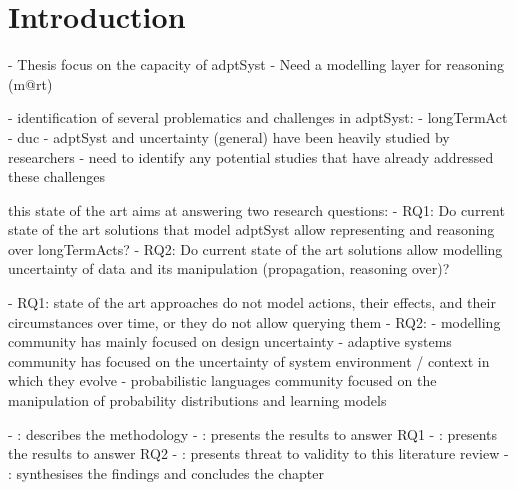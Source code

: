 \section{Introduction}

- Thesis focus on the capacity of \gls{adptSyst}
- Need a modelling layer for reasoning (\gls{m@rt})

- identification of several problematics and challenges in \gls{adptSyst}:
	- \gls{longTermAct}
	- \gls{duc}
- \gls{adptSyst} and uncertainty (general) have been heavily studied by researchers
- need to identify any potential studies that have already addressed these challenges

this state of the art aims at answering two research questions:
- RQ1: Do current state of the art solutions that model \gls{adptSyst} allow representing and reasoning over \glspl{longTermAct}? 
- RQ2: Do current state of the art solutions allow modelling uncertainty of data and its manipulation (propagation, reasoning over)? 


- RQ1: state of the art approaches do not model actions, their effects, and their circumstances over time, or they do not allow querying them
- RQ2:
	- modelling community has mainly focused on design uncertainty
	- adaptive systems community has focused on the uncertainty of system environment / context in which they evolve
	- probabilistic languages community focused on the manipulation of probability distributions and learning models
	

- : describes the methodology
- : presents the results to answer RQ1
- : presents the results to answer RQ2
- : presents threat to validity to this literature review
- : synthesises the findings and concludes the chapter
